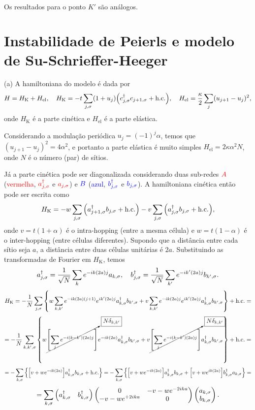 \documentclass[a4paper,10pt]{article}
\begin{document}
Os resultados para o ponto $K'$ são análogos.



\pagebreak

\section{Instabilidade de Peierls e modelo de Su-Schrieffer-Heeger}

(a) A hamiltoniana do modelo é dada por
$$
H = H_{\text{K}} + H_{\text{el}},
\quad
H_{\text{K}} = -t \sum_{j,\sigma} (1 + u_j) \qty(c_{j,\sigma}^\dagger c_{j+1, \sigma} + \text{h.c.}),
\quad
H_{\text{el}} = \frac{\kappa}{2} \sum_{j} (u_{j+1} - u_j)^2,
$$
onde $H_{\text{K}}$ é a parte cinética e $H_{\text{el}}$ é a parte elástica.

Considerando a modulação periódica $u_j = (-1)^j \alpha$, temos que $(u_{j+1} - u_j)^2 = 4 \alpha^2$, e portanto a parte elástica é muito simples $H_{\text{el}} = 2 \kappa \alpha^2 N$, onde $N$ é o número (par) de sítios.

Já a parte cinética pode ser diagonalizada considerando duas sub-redes $\textcolor{red}{A}$ (\textcolor{red}{vermelha}, $\textcolor{red}{a_{j,\sigma}^\dagger}$ e $\textcolor{red}{a_{j,\sigma}}$) e $\textcolor{blue}{B}$ (\textcolor{blue}{azul}, $\textcolor{blue}{b_{j,\sigma}^\dagger}$ e $\textcolor{blue}{b_{j,\sigma}}$). A hamiltoniana cinética então pode ser escrita como
$$
H_{\text{K}} = -w \sum_{j, \sigma} \qty(a_{j+1,\sigma}^\dagger b_{j,\sigma} + \text{h.c.})
-v \sum_{j,\sigma} \qty(a_{j,\sigma}^\dagger b_{j,\sigma} + \text{h.c.}),
$$
onde $v = t(1+\alpha)$ é o intra-hopping (entre a mesma célula) e $w = t(1-\alpha)$ é o inter-hopping (entre células diferentes). Supondo que a distância entre cada sítio seja $a$, a distância entre duas células unitárias é $2a$. Substituindo as transformadas de Fourier em $H_{\text{K}}$, temos
$$
a_{j,\sigma}^\dagger = \frac{1}{\sqrt{N}} \sum_{k} e^{-ik (2a) j} a_{k,\sigma}, \quad
b_{j,\sigma}^\dagger = \frac{1}{\sqrt{N}} \sum_{k'} e^{-ik' (2a) j} b_{k',\sigma}.
$$
$$
H_{\text{K}} = - \frac{1}{N}
\sum_{j,\sigma} \qty{ w
\sum_{k,k'} e^{-ik(2a)(j+1)} e^{ik'(2a)j} a_{k,\sigma}^\dagger b_{k',\sigma}
+ v
\sum_{k,k'} e^{-ik(2a)j} e^{ik'(2a)j} a_{k,\sigma}^\dagger b_{k',\sigma}} + \text{h.c.} =
$$
$$
= - \frac{1}{N}
\sum_{k, k', \sigma} \qty{ w
\cancelto{\boxed{N \delta_{k,k'}}}{\qty[\sum_{j} e^{-i(k-k')(2a)j}]}
e^{-ik(2a)} a_{k,\sigma}^\dagger b_{k',\sigma}
+ v
\cancelto{\boxed{N \delta_{k,k'}}}{\qty[\sum_{j} e^{-i(k-k')(2a)j}]}
a_{k,\sigma}^\dagger b_{k',\sigma}} + \text{h.c.} =
$$
$$
= - \sum_{k, \sigma} \qty{ \qty[ v  + w
e^{-ik(2a)}]
a_{k,\sigma}^\dagger b_{k,\sigma} + \text{h.c.} } =
- \sum_{k, \sigma} \qty{ \qty[ v  + w
e^{-ik(2a)}]
a_{k,\sigma}^\dagger b_{k,\sigma} +
\qty[ v  + w
e^{ik(2a)}]
b_{k,\sigma}^\dagger a_{k,\sigma}
} =
$$
$$
= \sum_{k, \sigma}
\begin{pmatrix}
a_{k,\sigma}^\dagger & b_{k,\sigma}^\dagger
\end{pmatrix}
\begin{pmatrix}
0 & -v - w e^{-2ika} \\
-v - w e^{+2ika} & 0
\end{pmatrix}
\begin{pmatrix}
a_{k,\sigma} \\ b_{k,\sigma}
\end{pmatrix}.
$$
\end{document}
